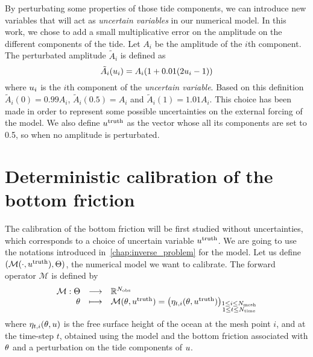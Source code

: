 \documentclass[../../Main_ManuscritThese.tex]{subfiles}
\begin{document}
By perturbating some properties of those tide components, we can
introduce new variables that will act as \emph{uncertain variables} in
our numerical model.  In this work, we chose to add a small
multiplicative error on the amplitude on the different components of
the tide. Let $A_i$ be the amplitude of the $i$th component. The
perturbated amplitude $\tilde{A}_i$ is defined as
\begin{equation}
  \label{eq:tide_error}
  \tilde{A}_i(u_i) = A_i (1 + 0.01(2u_i - 1))
\end{equation}
where $u_i$ is the $i$th component of the \emph{uncertain
  variable}. Based on this definition $\tilde{A}_i(0) = 0.99A_i$,
$\tilde{A}_i(0.5) = A_i$ and $\tilde{A}_i(1) = 1.01A_i$. This choice
has been made in order to represent some possible uncertainties on the
external forcing of the model. We also define $u^{\mathrm{truth}}$
as the vector whose all its components are set to \num{0.5}, so when no
amplitude is perturbated.

\section{Deterministic calibration of the bottom friction}
\label{sec:deterministic_calibration_bott}
The calibration of the bottom friction will be first studied without
uncertainties, which corresponds to a choice of uncertain variable
$u^{\mathrm{truth}}$.
We are going to use the notations introduced
in~\cref{chap:inverse_problem} for the model. Let us define
$(\mathcal{M}(\cdot,u^{\mathrm{truth}}),\Theta)$, the numerical
model we want to calibrate. The forward operator $\mathcal{M}$ is
defined by
\begin{equation}
  \begin{array}{rcl}
    \mathcal{M}: \Theta  &\longrightarrow& \mathbb{R}^{N_{\mathrm{obs}}} \\
     \theta & \longmapsto & \mathcal{M}(\theta, u^{\mathrm{truth}}) = \left(\eta_{t,i}(\theta, u^{\mathrm{truth}})\right)_{\substack{1 \leq i \leq N_{\mathrm{mesh}} \\ 1 \leq t \leq N_{\mathrm{time}}}} \\ 
  \end{array}
\end{equation}
where $\eta_{t,i}(\theta,u)$ is the free surface height of the ocean at the mesh point $i$, and at the time-step $t$, obtained using the model and the bottom friction associated with $\theta$ and a perturbation on the tide components of $u$.
\end{document}

